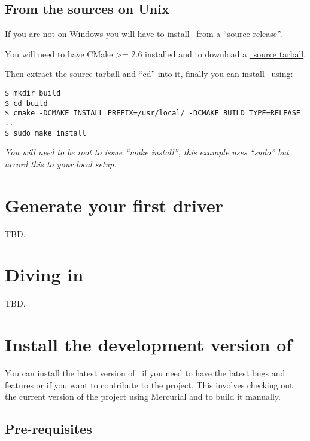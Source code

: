 \documentclass[francais]{rtxarticle}
\begin{document}
\subsection{From the sources on Unix}

If you are not on Windows you will have to install \rtx\ from a ``source
release''.

You will need to have CMake >= 2.6 installed and to download a
\href{http://rathaxes.googlecode.com/files/rathaxes-src-latest.tar.gz}{\rtx\ source tarball}.

Then extract the source tarball and ``cd'' into it, finally you can install
\rtx\ using:

\begin{lstlisting}
$ mkdir build
$ cd build
$ cmake -DCMAKE_INSTALL_PREFIX=/usr/local/ -DCMAKE_BUILD_TYPE=RELEASE ..
$ sudo make install
\end{lstlisting}

\emph{You will need to be root to issue ``make install'', this example uses
``sudo'' but accord this to your local setup.}

\section{Generate your first driver}

TBD.

\section{Diving in}

TBD.


\section{Install the development version of \rtx}

You can install the latest version of \rtx\ if you need to have the latest bugs
and features or if you want to contribute to the project. This involves checking
out the current version of the project using Mercurial and to build it manually.

\subsection{Pre-requisites}
\end{document}

